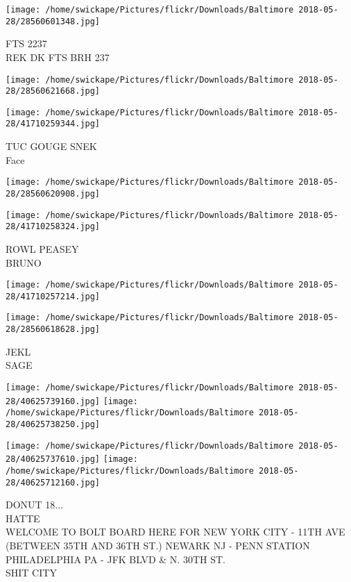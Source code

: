 \documentclass[10pt,letterpaper]{article}
\begin{document}
\vspace{0.25in}
\texttt{[image: /home/swickape/Pictures/flickr/Downloads/Baltimore 2018-05-28/28560601348.jpg]}

FTS 2237\\
REK DK FTS BRH 237\\
\pagebreak

\texttt{[image: /home/swickape/Pictures/flickr/Downloads/Baltimore 2018-05-28/28560621668.jpg]}

\vspace{0.25in}
\texttt{[image: /home/swickape/Pictures/flickr/Downloads/Baltimore 2018-05-28/41710259344.jpg]}

TUC GOUGE SNEK\\
Face\\
\pagebreak

\texttt{[image: /home/swickape/Pictures/flickr/Downloads/Baltimore 2018-05-28/28560620908.jpg]}

\vspace{0.25in}
\texttt{[image: /home/swickape/Pictures/flickr/Downloads/Baltimore 2018-05-28/41710258324.jpg]}

ROWL PEASEY\\
BRUNO\\
\pagebreak

\texttt{[image: /home/swickape/Pictures/flickr/Downloads/Baltimore 2018-05-28/41710257214.jpg]}

\vspace{0.25in}
\texttt{[image: /home/swickape/Pictures/flickr/Downloads/Baltimore 2018-05-28/28560618628.jpg]}

JEKL\\
SAGE\\
\pagebreak

\texttt{[image: /home/swickape/Pictures/flickr/Downloads/Baltimore 2018-05-28/40625739160.jpg]}
\texttt{[image: /home/swickape/Pictures/flickr/Downloads/Baltimore 2018-05-28/40625738250.jpg]}

\texttt{[image: /home/swickape/Pictures/flickr/Downloads/Baltimore 2018-05-28/40625737610.jpg]}
\texttt{[image: /home/swickape/Pictures/flickr/Downloads/Baltimore 2018-05-28/40625712160.jpg]}

DONUT 18...\\
HATTE\\
WELCOME TO BOLT BOARD HERE FOR NEW YORK CITY {-} 11TH AVE (BETWEEN 35TH AND 36TH ST.) NEWARK NJ {-} PENN STATION PHILADELPHIA PA {-} JFK BLVD \& N. 30TH ST.\\
SHIT CITY\\
\pagebreak
\end{document}
